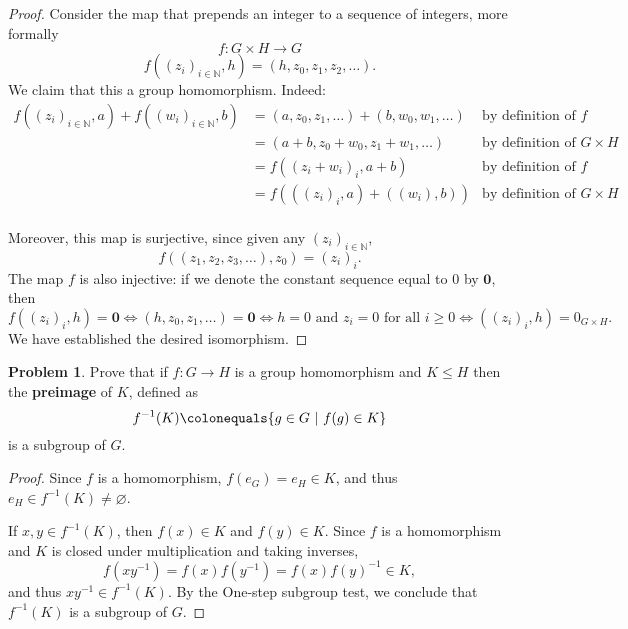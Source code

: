 \documentclass[11pt]{article}
\newcommand{\N}{\mathbb{N}}
\theoremstyle{definition}
\newtheorem{problem}{Problem}
\begin{document}
\begin{proof}
Consider the  map that prepends an integer to a sequence of integers, more formally
$$f\!: G\times H \longrightarrow G$$
$$f((z_i)_{i\in\N},h)=(h,z_0, z_1, z_2, \ldots).$$
We claim that this a group homomorphism. Indeed:
$$\begin{aligned}
f((z_i)_{i\in\N},a) + f((w_i)_{i\in\N},b) & = (a,z_0,z_1, \ldots) + (b,w_0,w_1, \ldots) & \textrm{by definition of } f\\
& = (a+b,z_0+w_0,z_1+w_1, \ldots) & \textrm{by definition of } G \times H\\
& = f((z_i+w_i)_i, a+b) & \textrm{by definition of } f\\
& = f(((z_i)_i,a)+((w_i),b)) & \textrm{by definition of } G \times H\\
\end{aligned}
$$

Moreover, this map is surjective, since given any $(z_i)_{i\in\N}$, 
$$f((z_1, z_2, z_3, \ldots), z_0) = (z_i)_i.$$
The map $f$ is also injective: if we denote the constant sequence equal to $0$ by $\mathbf{0}$, then
$$f((z_i)_{i},h)= \mathbf{0} \iff (h,z_0, z_1, \ldots) = \mathbf{0} \iff h=0 \textrm{ and } z_i=0 \textrm{ for all } i \geqslant 0 \iff ((z_i)_{i},h) = 0_{G \times H}.$$
We have established the desired isomorphism.
\end{proof}





\begin{problem}
Prove that if $f\!:G\to H$ is a group homomorphism and $K\leq H$ then the {\bf preimage} of $K$, defined as 
$$f^{-1}(K) \colonequals \{g\in G \  | \  f(g)\in K\}$$ 
is a subgroup of $G$.
\end{problem}

\begin{proof}
Since $f$ is a homomorphism, $f(e_G)=e_H\in K$, and thus $e_H\in f^{-1}(K)\neq \varnothing$.

If $x,y \in f^{-1}(K)$, then $f(x)\in K$ and $f(y)\in K$. Since $f$ is a homomorphism and $K$ is closed under multiplication and taking inverses,
$$f(xy^{-1})=f(x)f( y^{-1} )=f(x)f(y)^{-1}\in K,$$ 
and thus $xy^{-1}\in f^{-1}(K)$.
By the One-step subgroup test, we conclude that $f^{-1}(K)$ is a subgroup of $G$.
\end{proof}
\end{document}
